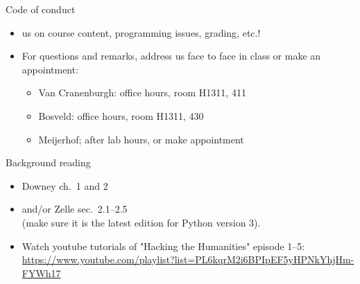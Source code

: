 \documentclass[aspectratio=169,usenames,dvipsnames]{beamer}
\begin{document}
\begin{frame}{Code of conduct}
    \begin{itemize}
        \item {} us on course content,
            programming issues, grading, etc.!
        \item For questions and remarks, address us face to face in class
            or make an appointment:
            \begin{itemize}
                \item Van Cranenburgh: office hours, room H1311, 411
                \item Bosveld: office hours, room H1311, 430
                \item Meijerhof; after lab hours, or make appointment
            \end{itemize}
    \end{itemize}
\end{frame}


\begin{frame}{Background reading}
    \begin{itemize}
        \item Downey ch.\ 1 and 2
        \item and/or Zelle sec.\ 2.1--2.5 \\
            (make sure it is the latest edition for Python version 3).
        \item Watch youtube tutorials of "Hacking the Humanities" episode 1--5:
            {\small\url{https://www.youtube.com/playlist?list=PL6kqrM2i6BPIpEF5yHPNkYhjHm-FYWh17}}
    \end{itemize}
\end{frame}
\end{document}
